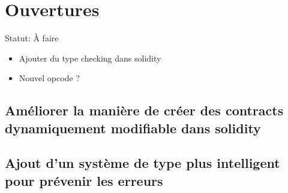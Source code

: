\section{Ouvertures}

Statut: À faire
\begin{itemize}
    \item Ajouter du type checking dans solidity
    \item Nouvel opcode ?
\end{itemize}

\subsection{Améliorer la manière de créer des contracts dynamiquement modifiable dans solidity}


\subsection{Ajout d'un système de type plus intelligent pour prévenir les erreurs}
